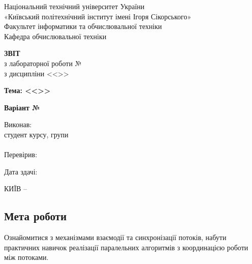 \documentclass[14pt, a4paper]{extreport}
\begin{document}
	
	\begin{titlepage}
		\begin{center}
			\normalsize
			Національний технічний університет України\\
			«Київський політехнічний інститут імені Ігоря Сікорського» \\[0.5em]
			Факультет інформатики та обчислювальної техніки\\
			Кафедра обчислювальної техніки
			
			\vfill
			
			{\large \textbf{ЗВІТ}\\[0.5em]}
			{з лабораторної роботи №\LabNumber \\}
			{з дисципліни <<\CourseTitle>>}
			
			\vspace{2em}
			
			{\textbf{Тема: <<\Topic>>}}
			
			\vspace{1em}
			
			{\textbf{Варіант №\Variant}}
			
			\vfill
			
			\begin{flushright}
				Виконав: \\ студент \CourseNumber{} курсу, групи \StudentGroup \\
				\StudentName \\[1em]
				Перевірив: \\ \Teacher
			\end{flushright}
			
			\vfill
			
			\begin{flushright}
				Дата здачі: \DTMtoday
			\end{flushright}
			
			\vspace{5em}
			КИЇВ -- \ReportYear
		\end{center}
	\end{titlepage}
	
	\clearpage
	\setcounter{page}{2}
	
	\subsection*{Мета роботи} 
	Ознайомитися з механізмами взаємодії та синхронізації потоків, набути практичних навичок реалізації паралельних алгоритмів з координацією роботи між потоками.
	
\end{document}
